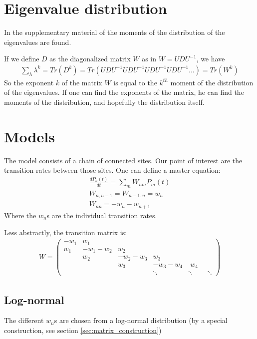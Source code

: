 \documentclass[onecolumn,fleqn]{revtex4}
\begin{document}
\section{Eigenvalue distribution}
In the supplementary material of \cite{Amir:2010:PRL} the moments of the distribution of the eigenvalues are found. 

If we define $D$ as the diagonalized matrix $W$ as in $W=UDU^{-1}$, we have
\begin{align}\label{eq:eig_moments}
\sum_\lambda \lambda^k = Tr (D^k) = Tr(UDU^{-1}UDU^{-1}UDU^{-1}UDU^{-1}...) = Tr (W^k)
\end{align}
So the exponent $k$ of the matrix $W$ is equal to the $k^{th}$ moment of the distribution of the eigenvalues. If one can find the exponents of the matrix, he can find the moments of the distribution, and hopefully the distribution itself. 

\section{Models}\label{sec:our_model}
The model consists of a chain of connected sites. Our point of interest are the transition rates between those sites. One can define a master equation:
\begin{align}
\frac{dP_n(t)}{dt} = \sum_m W_{nm}P_m(t) \\
W_{n,n-1} = W_{n-1,n} = w_n \\
W_{nn} = -w_n - w_{n+1}
\end{align}
Where the $w_n$s are the individual transition rates.

Less abstractly, the transition matrix is:
\begin{align}
W = 
\begin{pmatrix}
-w_1  & w_1 \\
w_1  & -w_1-w_2 &  w_2 \\
 & w_2 & -w_2-w_3 &  w_3 \\
& & w_3 & -w_3-w_4 & \; w_4 \\
& & & \ddots &\ddots&\;\;\ddots
\end{pmatrix}
\end{align}
\subsection{Log-normal}
The different $w_n$s are chosen from a log-normal distribution (by a special construction, see section \ref{sec:matrix_construction})
\end{document}
